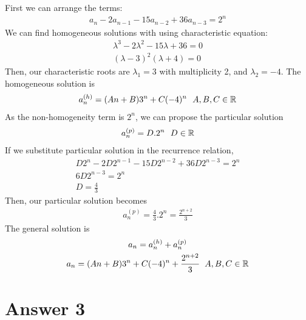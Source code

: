 \documentclass[11pt]{article}
\begin{document}
    First we can arrange the terms: 
        \begin{align*}
            a_n -2a_{n-1} -15a_{n-2} +36a_{n-3} = 2^n
        \end{align*}
    We can find homogeneous solutions with using characteristic equation:
        \begin{align*}
            \lambda^3-2\lambda^2-15\lambda+36 = 0\\
            (\lambda-3)^2(\lambda+4)=0
        \end{align*}
    Then, our characteristic roots are $\lambda_{1}=3$ with multiplicity 2, and $\lambda_2 = -4$. The homogeneous solution is
        \begin{align*}
            a_n^{(h)} = (An+B)3^n + C(-4)^n \-\ \-\  A,B,C \in \mathbb{R}
        \end{align*}
    As the non-homogeneity term is $2^n$, we can propose the particular solution
        \begin{align*}
            a_n^{(p)} = D.2^n \-\ \-\ D \in \mathbb{R}
        \end{align*}
    If we substitute particular solution in the recurrence relation,
        \begin{gather*}
            D2^n -2D2^{n-1} -15D2^{n-2}+36D2^{n-3} = 2^n\\
            6D2^{n-3} = 2^n\\
            D = \frac{4}{3}
        \end{gather*}
    Then, our particular solution becomes
        \begin{gather*}
            a_n^{(p)} = \frac{4}{3}.2^n = \frac{2^{n+2}}{3}
        \end{gather*}
    The general solution is
        \begin{gather*}
            a_n = a_n^{(h)} + a_n^{(p)}\\
            a_n = (An+B)3^n + C(-4)^n + \frac{2^{n+2}}{3} \hspace{2mm} A,B,C \in \mathbb{R}
        \end{gather*}


\section*{Answer 3}
\end{document}
